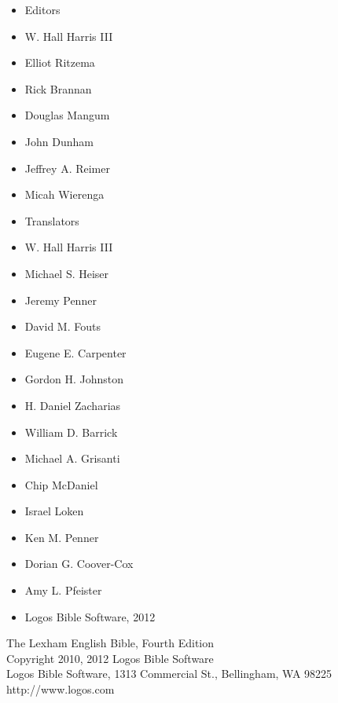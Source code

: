 


\begin{multicols}{2}

\begin{itemize}
    \item Editors
    \item W. Hall Harris III
    \item Elliot Ritzema
    \item Rick Brannan
    \item Douglas Mangum
    \item John Dunham
    \item Jeffrey A. Reimer
    \item Micah Wierenga
    \item Translators
    \item W. Hall Harris III
    \item Michael S. Heiser
    \item Jeremy Penner
    \item David M. Fouts
    \item Eugene E. Carpenter
    \item Gordon H. Johnston
    \item H. Daniel Zacharias
    \item William D. Barrick
    \item Michael A. Grisanti
    \item Chip McDaniel
    \item Israel Loken
    \item Ken M. Penner
    \item Dorian G. Coover-Cox
    \item Amy L. Pfeister
    \item Logos Bible Software, 2012
\end{itemize}

\end{multicols}


The Lexham English Bible, Fourth Edition\\
Copyright 2010, 2012 Logos Bible Software\\
Logos Bible Software, 1313 Commercial St., Bellingham, WA 98225\\
http://www.logos.com











